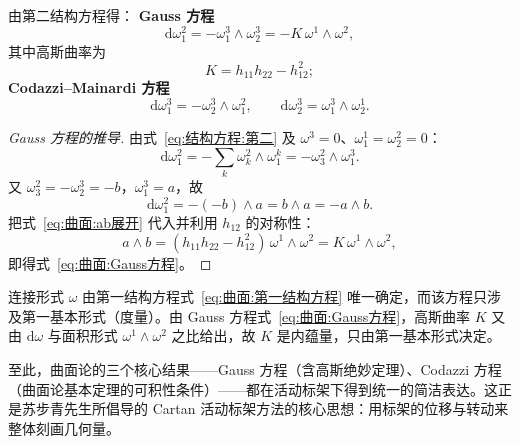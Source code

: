 \begin{theorem}
	由第二结构方程得：
	\textbf{Gauss 方程}
	\begin{equation}
		\mathrm{d}\omega_{1}^{2}=-\omega_{1}^{3}\wedge\omega_{2}^{3}
		=-K\,\omega^{1}\wedge\omega^{2},
		\label{eq:曲面:Gauss方程}
	\end{equation}
	其中高斯曲率为
	\begin{equation}
		K=h_{11}h_{22}-h_{12}^{2};
		\label{eq:曲面:高斯曲率}
	\end{equation}
	\textbf{Codazzi--Mainardi 方程}
	\begin{equation}
		\mathrm{d}\omega_{1}^{3}=-\omega_{2}^{3}\wedge\omega_{1}^{2},\qquad
		\mathrm{d}\omega_{2}^{3}=\omega_{1}^{3}\wedge\omega_{2}^{1}.
		\label{eq:曲面:Codazzi方程}
	\end{equation}
\end{theorem}

\begin{proof}[Gauss 方程的推导]
	由式~\eqref{eq:结构方程:第二} 及 $\omega^{3}=0$、$\omega_{1}^{1}=\omega_{2}^{2}=0$：
	\begin{equation}
		\mathrm{d}\omega_{1}^{2}
		=-\sum_{k}\omega_{k}^{2}\wedge\omega_{1}^{k}
		=-\omega_{3}^{2}\wedge\omega_{1}^{3}.
		\label{eq:曲面:Gauss推导}
	\end{equation}
	又 $\omega_{3}^{2}=-\omega_{2}^{3}=-b$，$\omega_{1}^{3}=a$，故
	\begin{equation}
		\mathrm{d}\omega_{1}^{2}=-(-b)\wedge a=b\wedge a=-a\wedge b.
		\label{eq:曲面:Gauss推导2}
	\end{equation}
	把式~\eqref{eq:曲面:ab展开} 代入并利用 $h_{12}$ 的对称性：
	\begin{equation}
		a\wedge b=(h_{11}h_{22}-h_{12}^{2})\,\omega^{1}\wedge\omega^{2}=K\,\omega^{1}\wedge\omega^{2},
		\label{eq:曲面:Gauss推导3}
	\end{equation}
	即得式~\eqref{eq:曲面:Gauss方程}。
\end{proof}

\begin{theorem}[高斯绝妙定理的又一证明]
	连接形式 $\omega$ 由第一结构方程式~\eqref{eq:曲面:第一结构方程} 唯一确定，而该方程只涉及第一基本形式（度量）。由 Gauss 方程式~\eqref{eq:曲面:Gauss方程}，高斯曲率 $K$ 又由 $\mathrm{d}\omega$ 与面积形式 $\omega^{1}\wedge\omega^{2}$ 之比给出，故 $K$ 是内蕴量，只由第一基本形式决定。
	\label{thm:绝妙定理又一证明}
\end{theorem}

\begin{remark}
	至此，曲面论的三个核心结果——Gauss 方程（含高斯绝妙定理）、Codazzi 方程（曲面论基本定理的可积性条件）——都在活动标架下得到统一的简洁表达。这正是苏步青先生所倡导的 Cartan 活动标架方法的核心思想：用标架的位移与转动来整体刻画几何量。
\end{remark}
